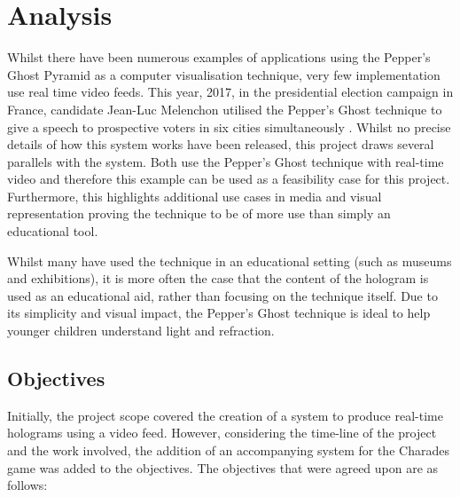 \section{Analysis}
Whilst there have been numerous examples of applications using the Pepper's Ghost Pyramid as a computer visualisation technique, very few implementation use real time video feeds. This year, 2017, in the presidential election campaign in France, candidate Jean-Luc Melenchon utilised the Pepper's Ghost technique to give a speech to prospective voters in six cities simultaneously \cite{french_elections}. Whilst no precise details of how this system works have been released, this project draws several parallels with the system. Both use the Pepper's Ghost technique with real-time video and therefore this example can be used as a feasibility case for this project. Furthermore, this highlights additional use cases in media and visual representation proving the technique to be of more use than simply an educational tool.

Whilst many have used the technique in an educational setting (such as museums and exhibitions), it is more often the case that the content of the hologram is used as an educational aid, rather than focusing on the technique itself. Due to its simplicity and visual impact, the Pepper's Ghost technique is ideal to help younger children understand light and refraction.  

\subsection{Objectives}
Initially, the project scope covered the creation of a system to produce real-time holograms using a video feed. However, considering the time-line of the project and the work involved, the addition of an accompanying system for the Charades game was added to the objectives. The objectives that were agreed upon are as follows:

